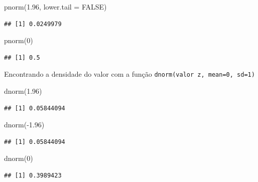 \documentclass[
]{article}
\newenvironment{Shaded}{\begin{snugshade}}{\end{snugshade}}
\newcommand{\AttributeTok}[1]{\textcolor[rgb]{0.77,0.63,0.00}{#1}}
\newcommand{\ConstantTok}[1]{\textcolor[rgb]{0.00,0.00,0.00}{#1}}
\newcommand{\DecValTok}[1]{\textcolor[rgb]{0.00,0.00,0.81}{#1}}
\newcommand{\FloatTok}[1]{\textcolor[rgb]{0.00,0.00,0.81}{#1}}
\newcommand{\FunctionTok}[1]{\textcolor[rgb]{0.00,0.00,0.00}{#1}}
\newcommand{\NormalTok}[1]{#1}
\newcommand{\SpecialCharTok}[1]{\textcolor[rgb]{0.00,0.00,0.00}{#1}}
\begin{document}
\begin{Shaded}
\begin{Highlighting}[]
\FunctionTok{pnorm}\NormalTok{(}\FloatTok{1.96}\NormalTok{, }\AttributeTok{lower.tail =} \ConstantTok{FALSE}\NormalTok{)}
\end{Highlighting}
\end{Shaded}

\begin{verbatim}
## [1] 0.0249979
\end{verbatim}

\begin{Shaded}
\begin{Highlighting}[]
\FunctionTok{pnorm}\NormalTok{(}\DecValTok{0}\NormalTok{)}
\end{Highlighting}
\end{Shaded}

\begin{verbatim}
## [1] 0.5
\end{verbatim}

Encontrando a densidade do valor com a função
\texttt{dnorm(valor\ z,\ mean=0,\ sd=1)}

\begin{Shaded}
\begin{Highlighting}[]
\FunctionTok{dnorm}\NormalTok{(}\FloatTok{1.96}\NormalTok{)}
\end{Highlighting}
\end{Shaded}

\begin{verbatim}
## [1] 0.05844094
\end{verbatim}

\begin{Shaded}
\begin{Highlighting}[]
\FunctionTok{dnorm}\NormalTok{(}\SpecialCharTok{{-}}\FloatTok{1.96}\NormalTok{)}
\end{Highlighting}
\end{Shaded}

\begin{verbatim}
## [1] 0.05844094
\end{verbatim}

\begin{Shaded}
\begin{Highlighting}[]
\FunctionTok{dnorm}\NormalTok{(}\DecValTok{0}\NormalTok{)}
\end{Highlighting}
\end{Shaded}

\begin{verbatim}
## [1] 0.3989423
\end{verbatim}
\end{document}
